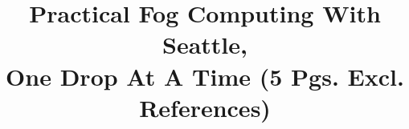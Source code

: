 \documentclass[conference]{IEEEtran}
\begin{document}
\title{Practical Fog Computing With Seattle,\\
One Drop At A Time (5 Pgs. Excl. References)}


\author{
\and
{}
\and
{}
}

\maketitle









\end{document}
